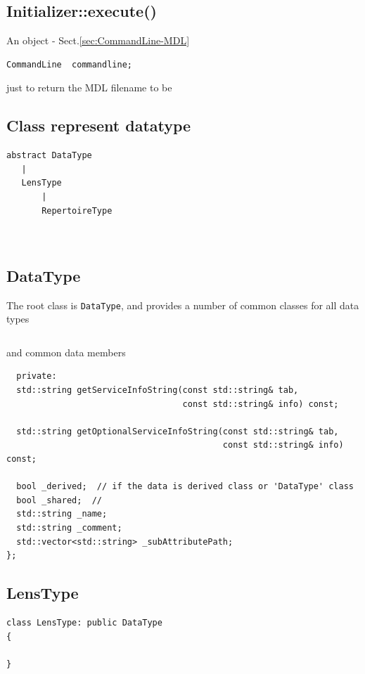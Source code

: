 \subsection{Initializer::execute()}
\label{sec:Initializer-execute()}

An object  - Sect.\ref{sec:CommandLine-MDL}
\begin{verbatim}
CommandLine  commandline;
\end{verbatim}
just to return the MDL filename to be 

\subsection{Class represent datatype}

\begin{verbatim}
abstract DataType
   |
   LensType
       |
       RepertoireType
       
   
\end{verbatim}

\subsection{DataType}
\label{sec:DataType}

The root class is \verb!DataType!, and provides a number of common classes for
all data types 
\begin{verbatim}

\end{verbatim}
and common data members
\begin{verbatim}
  private:
  std::string getServiceInfoString(const std::string& tab,
                                   const std::string& info) const;

  std::string getOptionalServiceInfoString(const std::string& tab,
                                           const std::string& info) const;

  bool _derived;  // if the data is derived class or 'DataType' class
  bool _shared;  // 
  std::string _name;
  std::string _comment;
  std::vector<std::string> _subAttributePath;
};
\end{verbatim}

\subsection{LensType}
\label{sec:LensType}

\begin{verbatim}
class LensType: public DataType
{

}
\end{verbatim}


